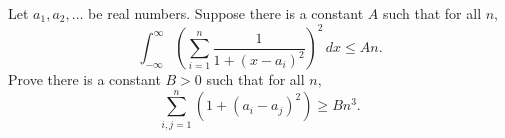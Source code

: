 Let $a_1,a_2,\dots$ be real numbers. Suppose there is a constant $A$ such that for all $n,$
\[\int_{-\infty}^{\infty}\left(\sum_{i=1}^n\frac1{1+(x-a_i)^2}\right)^2\,dx\le An.\]
Prove there is a constant $B>0$ such that for all $n,$
\[\sum_{i,j=1}^n\left(1+(a_i-a_j)^2\right)\ge Bn^3.\]